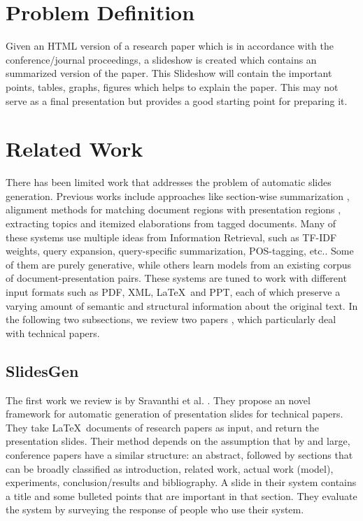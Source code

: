 \documentclass[10pt,twocolumn,letterpaper]{article}
\begin{document}
\section{Problem Definition}
Given an HTML version of a research paper which is in accordance with the conference/journal
proceedings, a slideshow is created which contains an summarized version of the paper.
This Slideshow will contain the important points, tables, graphs, figures which helps to
explain the paper. This may not serve as a final presentation but provides a good starting
point for preparing it.

\section{Related Work}
There has been limited work that addresses the problem of automatic slides generation.
Previous works include approaches like section-wise summarization \cite{sravanthi},
alignment methods for matching document regions with presentation regions \cite{brandon},
extracting topics and itemized elaborations from tagged documents.
Many of these systems use multiple ideas from Information Retrieval, such as TF-IDF weights,
query expansion, query-specific summarization, POS-tagging, etc..
Some of them are purely generative, while others learn models from an existing corpus of
document-presentation pairs. These systems are tuned to work with different input formats
such as PDF, XML, \LaTeX\ and PPT, each of which preserve a varying amount of semantic and
structural information about the original text. In the following two subsections, we review
two papers \cite{sravanthi},\cite{brandon} which particularly deal with technical papers.

\subsection{SlidesGen}
The first work we review is by Sravanthi et al. \cite{sravanthi}. They propose an
novel framework for automatic generation of presentation slides for technical papers.
They take \LaTeX\ documents of research papers as input, and return the presentation slides.
Their method depends on the assumption that by and large, conference papers have a similar structure:
an abstract, followed by sections that can be broadly classified as introduction, related work,
actual work (model), experiments, conclusion/results and bibliography.
A slide in their system contains a title and some bulleted points that are important in 
that section. They evaluate the system by surveying the response of people who use their system.
\end{document}
